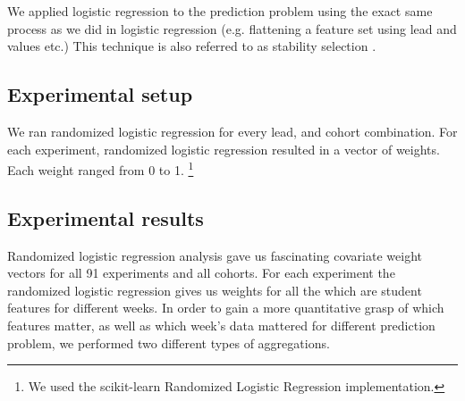 We applied \rLR logistic regression to the \sti prediction problem using the exact same process as we did in logistic regression (e.g. flattening a feature set using lead and \lag values etc.) This technique is also referred to as stability selection \cite{meinshausen2010stability}.


\subsection{Experimental setup}
We ran randomized logistic regression for every lead, \lag and cohort combination. For each experiment, randomized logistic regression resulted in a vector of \cov weights. Each weight ranged from 0 to 1.
\footnote{We used the scikit-learn Randomized Logistic Regression implementation.}

\subsection{Experimental results}
Randomized logistic regression analysis gave us fascinating covariate weight vectors for all 91 experiments and all cohorts. For each experiment the randomized logistic regression gives us weights for all the \cov which are student features for different weeks.  In order to gain a more quantitative grasp of which features matter, as well as which week's data mattered for different prediction problem, we performed two different types of aggregations. 

